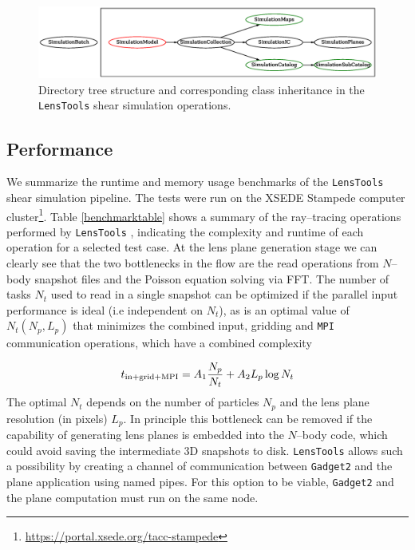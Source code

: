 \documentclass[5p]{elsarticle}
\newcommand{\ttt}[1]{\texttt{#1}}
\newcommand{\LT}{\texttt{LensTools} }
\begin{document}
\begin{figure}
\includegraphics[scale=0.6]{Figures/inheritance.eps}
\caption{Directory tree structure and corresponding class inheritance in the \LT shear simulation operations.}
\label{inheritance}
\end{figure}

\subsection{Performance}
%
We summarize the runtime and memory usage benchmarks of the \LT shear simulation pipeline. The tests were run on the XSEDE Stampede computer cluster\footnote{\url{https://portal.xsede.org/tacc-stampede}}. Table \ref{benchmarktable} shows a summary of the ray--tracing operations performed by \LT, indicating the complexity and runtime of each operation for a selected test case. At the lens plane generation stage we can clearly see that the two bottlenecks in the flow are the read operations from $N$--body snapshot files and the Poisson equation solving via FFT. The number of tasks $N_t$ used to read in a single snapshot can be optimized if the parallel input performance is ideal (i.e independent on $N_t$), as is an optimal value of $N_t(N_p,L_p)$ that minimizes the combined input, gridding and \ttt{MPI} communication operations, which have a combined complexity

\begin{equation}
t_{\rm in+grid+MPI} = A_1\frac{N_p}{N_t} + A_2L_p\log{N_t}
\end{equation} 
%
The optimal $N_t$ depends on the number of particles $N_p$ and the lens plane resolution (in pixels) $L_p$. In principle this bottleneck can be removed if the capability of generating lens planes is embedded into the $N$--body code, which could avoid saving the intermediate 3D snapshots to disk. \LT allows such a possibility by creating a channel of communication between \ttt{Gadget2} and the plane application using named pipes. For this option to be viable, \ttt{Gadget2} and the plane computation must run on the same node. 
\end{document}
